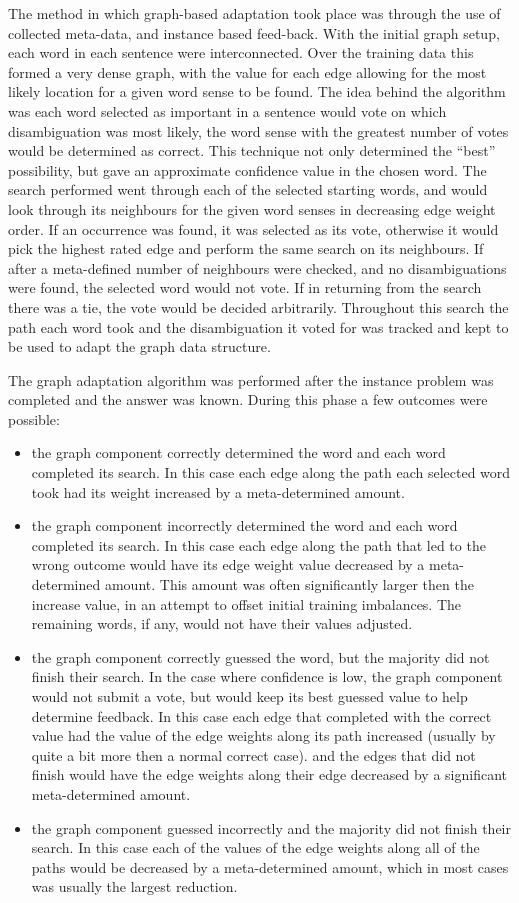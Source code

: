 The method in which graph-based adaptation took place was through the use of collected meta-data, and instance based feed-back.  With the initial graph setup, each word in each sentence were interconnected. Over the training data this formed a very dense graph, with the value for each edge allowing for the most likely location for a given word sense to be found.  The idea behind the algorithm was each word selected as important in a sentence would vote on which disambiguation was most likely, the word sense with the greatest number of votes would be determined as correct.  This technique not only determined the ``best'' possibility, but gave an approximate confidence value in the chosen word. The search performed went through each of the selected starting words, and would look through its neighbours for the given word senses in decreasing edge weight order. If an occurrence was found, it was selected as its vote, otherwise it would pick the highest rated edge and perform the same search on its neighbours.  If after a meta-defined number of neighbours were checked, and no disambiguations were found, the selected word would not vote.  If in returning from the search there was a tie, the vote would be decided arbitrarily.  Throughout this search the path each word took and the disambiguation it voted for was tracked and kept to be used to adapt the graph data structure.

The graph adaptation algorithm was performed after the instance problem was completed and the answer was known.  During this phase a few outcomes were possible:
\begin{itemize}
	 \item the graph component correctly determined the word and each word completed its search.  In this case each edge along the path each selected word took had its weight increased by a meta-determined amount.
	 \item the graph component incorrectly determined the word and each word completed its search. In this case each edge along the path that led to the wrong outcome would have its edge weight value decreased by a meta-determined amount. This amount was often significantly larger then the increase value, in an attempt to offset initial training imbalances. The remaining words, if any, would not have their values adjusted.
	\item the graph component correctly guessed the word, but the majority did not finish their search. In the case where confidence is low, the graph component would not submit a vote, but would keep its best guessed value to help determine feedback. In this case each edge that completed with the correct value had the value of the edge weights along its path increased (usually by quite a bit more then a normal correct case). and the edges that did not finish would have the edge weights along their edge decreased by a significant meta-determined amount.
	\item the graph component guessed incorrectly and the majority did not finish their search. In this case each of the values of the edge weights along all of the paths would be decreased by a meta-determined amount, which in most cases was usually the largest reduction.
\end{itemize}

